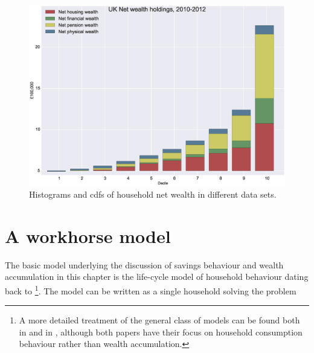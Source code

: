 \begin{figure}
\includegraphics[width=\columnwidth]{was_wealth_holdings}
\caption{Histograms and cdfs of household net wealth in different data sets.}
\label{fig:was_wealthholdings}
\end{figure}

\section{A workhorse model}
The basic model underlying the discussion of savings behaviour and wealth 
accumulation in this chapter is the life-cycle model of household behaviour 
dating back to \citet{ModiglianiBrumberg1954} \footnote{A more detailed 
treatment of the general class of models can be found both in 
\citet{BrowningCrossley2001} and in \citet{AttanasioWeber2010}, although both 
papers have their focus on household consumption behaviour rather than wealth 
accumulation.}. The model can be written as a single household solving the 
problem


